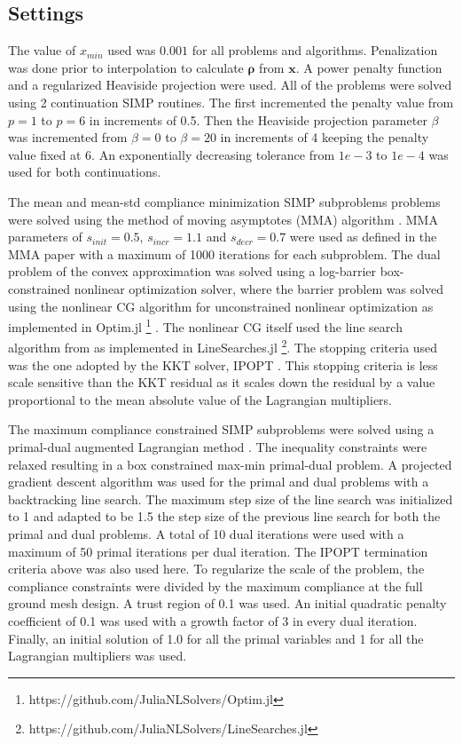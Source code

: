   \subsection{Settings}

    The value of $x_{min}$ used was $0.001$ for all problems and algorithms. Penalization was done prior to interpolation to calculate $\bm{\rho}$ from $\bm{x}$. A power penalty function and a regularized Heaviside projection were used. All of the problems were solved using 2 continuation SIMP routines. The first incremented the penalty value from $p = 1$ to $p = 6$ in increments of 0.5. Then the Heaviside projection parameter $\beta$ was incremented from $\beta = 0$ to $\beta = 20$ in increments of 4 keeping the penalty value fixed at 6. An exponentially decreasing tolerance from $1e-3$ to $1e-4$ was used for both continuations.

    The mean and mean-std compliance minimization SIMP subproblems problems were solved using the method of moving asymptotes (MMA) algorithm \cite{Svanberg1987}. MMA parameters of $s_{init} = 0.5$, $s_{incr} = 1.1$ and $s_{decr} = 0.7$ were used as defined in the MMA paper with a maximum of 1000 iterations for each subproblem. The dual problem of the convex approximation was solved using a log-barrier box-constrained nonlinear optimization solver, where the barrier problem was solved using the nonlinear CG algorithm for unconstrained nonlinear optimization \citep{Nocedal2006} as implemented in Optim.jl \footnote{https://github.com/JuliaNLSolvers/Optim.jl} \citep{KMogensen2018}. The nonlinear CG itself used the line search algorithm from \cite{Hager2006} as implemented in LineSearches.jl \footnote{https://github.com/JuliaNLSolvers/LineSearches.jl}. The stopping criteria used was the one adopted by the KKT solver, IPOPT \citep{Wachter2006}. This stopping criteria is less scale sensitive than the KKT residual as it scales down the residual by a value proportional to the mean absolute value of the Lagrangian multipliers.

    The maximum compliance constrained SIMP subproblems were solved using a primal-dual augmented Lagrangian method \citep{Bertsekas1996}. The inequality constraints were relaxed resulting in a box constrained max-min primal-dual problem. A projected gradient descent algorithm was used for the primal and dual problems with a backtracking line search. The maximum step size of the line search was initialized to 1 and adapted to be 1.5 the step size of the previous line search for both the primal and dual problems. A total of 10 dual iterations were used with a maximum of 50 primal iterations per dual iteration. The IPOPT termination criteria above was also used here. To regularize the scale of the problem, the compliance constraints were divided by the maximum compliance at the full ground mesh design. A trust region of 0.1 was used. An initial quadratic penalty coefficient of 0.1 was used with a growth factor of 3 in every dual iteration. Finally, an initial solution of 1.0 for all the primal variables and 1 for all the Lagrangian multipliers was used.

